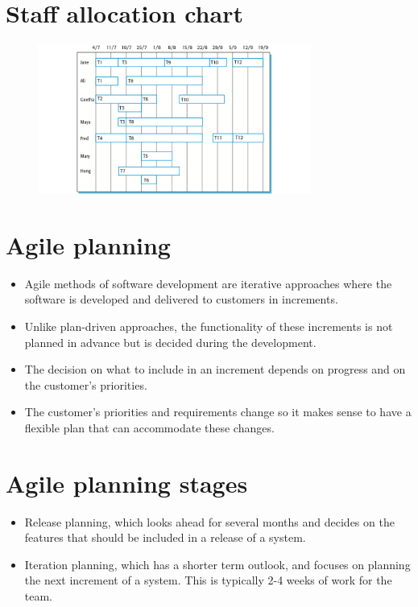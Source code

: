 \section{Staff allocation chart}
\begin{figure}[h!]
    \centering
    \includegraphics[width = 0.8\textwidth]{./figures/L6_4.png}
    \caption{}
    \label{fig:L6_4}
\end{figure}

\section{Agile planning}
\begin{itemize}

\item Agile methods of software development are iterative approaches where the software is developed and delivered to customers in increments.

\item Unlike plan-driven approaches, the functionality of these increments is not planned in advance but is decided during the development.

  \item The decision on what to include in an increment depends on progress and on the customer’s priorities.

\item The customer’s priorities and requirements change so it makes sense to have a flexible plan that can accommodate these changes.
\end{itemize}
\section{Agile planning stages}
\begin{itemize}

\item Release planning, which looks ahead for several months and decides on the features that should be included in a release of a system.

\item Iteration planning, which has a shorter term outlook, and focuses on planning the next increment of a system. This is typically 2-4 weeks of work for the team.
\end{itemize}

